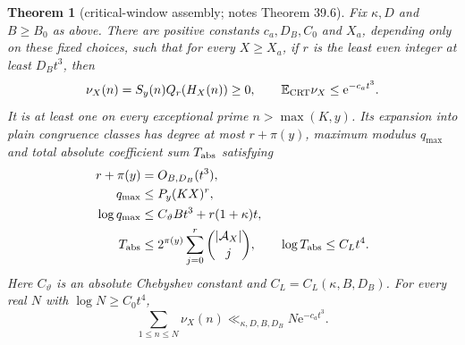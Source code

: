 \documentclass[10pt,reqno]{amsart}
\newtheorem{theorem}{Theorem}[section]
\theoremstyle{remark}
\newcommand{\A}{\mathcal A}
\newcommand{\E}{\mathbb E}
\newcommand{\e}{\mathrm e}
\begin{document}
\begin{theorem}[critical-window assembly; notes Theorem 39.6]\label{thm:assembly}
Fix $\kappa,D$ and $B\geq B_0$ as above.  There are positive constants
$c_a,D_B,C_0$ and $X_a$, depending only on these fixed choices, such that
for every $X\geq X_a$, if $r$ is the least even integer at least $D_Bt^3$,
then
\begin{equation}\label{eq:majorant}
 \nu_X(n)=S_y(n)Q_r(H_X(n))\geq0,\qquad
 \E_{\rm CRT}\nu_X\leq\e^{-c_at^3}.
\end{equation}
It is at least one on every exceptional prime $n>\max(K,y)$.
Its expansion into plain congruence classes has degree at most
$r+\pi(y)$, maximum modulus $q_{\max}$ and total absolute coefficient
sum $T_{\rm abs}$ satisfying
\begin{equation}\label{eq:ledger}
 \begin{aligned}
 r+\pi(y)&=O_{B,D_B}(t^3),\\
 q_{\max}&\leq P_y(KX)^r,\\
 \log q_{\max}&\leq C_\vartheta Bt^3+r(1+\kappa)t,\\
 T_{\rm abs}&\leq2^{\pi(y)}\sum_{j=0}^r\binom{|\A_X|}j,
 \qquad\log T_{\rm abs}\leq C_Lt^4.
 \end{aligned}
\end{equation}
Here $C_\vartheta$ is an absolute Chebyshev constant and
$C_L=C_L(\kappa,B,D_B)$.  For every real $N$ with $\log N\geq C_0t^4$,
\begin{equation}\label{eq:integermean}
 \sum_{1\leq n\leq N}\nu_X(n)\ll_{\kappa,D,B,D_B}N\e^{-c_at^3}.
\end{equation}
\end{theorem}
\end{document}
